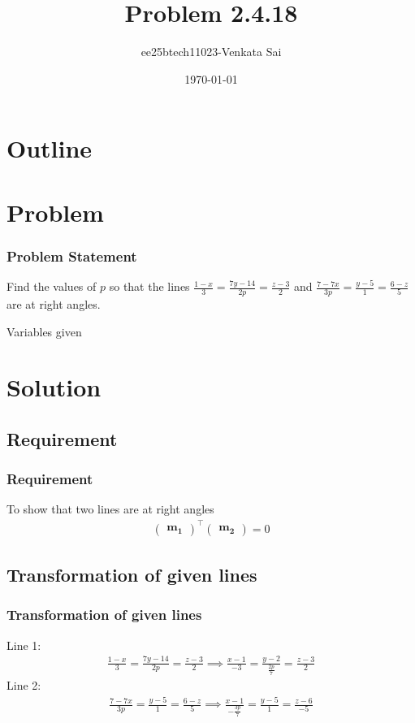 \documentclass{beamer}
\title{Problem 2.4.18}
\author{ee25btech11023-Venkata Sai}
\date{\today}
\theoremstyle{remark}
\newcommand{\myvec}[1]{\ensuremath{\begin{pmatrix}#1\end{pmatrix}}}
\let\vec\mathbf
\numberwithin{equation}{section}
\begin{document}
\begin{frame}
\titlepage
\end{frame}

\section*{Outline}
\begin{frame}
\tableofcontents
\end{frame}
\section{Problem}
\begin{frame}
\frametitle{Problem Statement}
%
Find the values of $p$ so that the lines $\frac{1-x}{3} = \frac{7y-14}{2p} = \frac{z-3}{2}$ and $\frac{7-7x}{3p} = \frac{y-5}{1} = \frac{6-z}{5}$ are at right angles. 
 \begin{table}[h!]    
  \centering
  
  \caption{Variables given}
  \label{tab 1.4.9.2}
\end{table}
\end{frame}

\section{Solution}
\subsection{Requirement}
\begin{frame}
\frametitle{Requirement}
To show that two lines are at right angles
\begin{align}
 \myvec{\vec{m_1}}^\top\myvec{\vec{m_2}} = 0 
\end{align}

\end{frame}
\subsection{Transformation of given lines}
\begin{frame}
\frametitle{Transformation of given lines}
Line 1:
\begin{align}
\frac{1-x}{3} = \frac{7y-14}{2p} = \frac{z-3}{2} \implies \frac{x-1}{-3} = \frac{y-2}{\frac{2p}{7}} = \frac{z-3}{2}
\end{align}
Line 2:
\begin{align}
\frac{7-7x}{3p} = \frac{y-5}{1} = \frac{6-z}{5} \implies \frac{x-1}{-\frac{3p}{7}} = \frac{y-5}{1} = \frac{z-6}{-5}
\end{align}
\end{frame}
\end{document}
